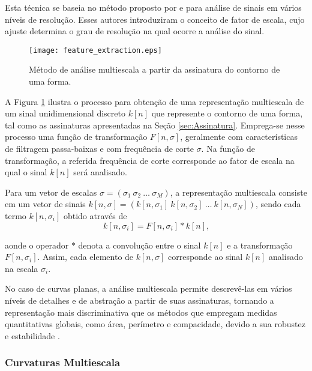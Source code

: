 Esta técnica se baseia no método proposto por  e  para análise de sinais em vários níveis de resolução. Esses autores introduziram o conceito de fator de escala, cujo ajuste determina o grau de resolução na qual ocorre a análise do sinal. 

\begin{figure}[h!]
  \caption{\label{fig:ms} Método de análise multiescala a partir da assinatura do contorno de uma forma.}
  \centering
  \texttt{[image: feature\_extraction.eps]}
\end{figure}

A Figura \ref{fig:ms} ilustra o processo para obtenção de uma representação multiescala de um sinal unidimensional discreto $k[n]$ que represente o contorno de uma forma, tal como as assinaturas apresentadas na Seção \ref{sec:Assinatura}. Emprega-se nesse processo uma função de transformação $F[n,\sigma]$, geralmente com características de filtragem passa-baixas e com frequência de corte $\sigma$. Na função de transformação, a referida frequência de corte corresponde ao fator de escala na qual o sinal $k[n]$ será analisado. 

Para um vetor de escalas $\sigma = (\sigma_1\:\sigma_2\:\ldots\:\sigma_M) $, a representação multiescala consiste em um vetor de sinais $k[n,\sigma] = (k[n,\sigma_1]\:k[n,\sigma_2]\:\ldots\:k[n,\sigma_N])$, sendo cada termo $k[n,\sigma_i]$ obtido através de
\begin{equation}\label{eq:ms1}
k[n,\sigma_i] = F[n,\sigma_i]*k[n]\text{,}
\end{equation}

\noindent
 aonde o operador $*$ denota a convolução entre o sinal $k[n]$ e a transformação $F[n,\sigma_i]$.  Assim, cada elemento de $k[n,\sigma]$ corresponde ao sinal $k[n]$ analisado na escala $\sigma_i$.

No caso de curvas planas, a análise multiescala permite descrevê-las em vários níveis de detalhes e de abstração a partir de suas assinaturas, tornando a representação mais discriminativa que os métodos que empregam medidas quantitativas globais, como área, perímetro e compacidade, devido a sua robustez e estabilidade \cite{4756134}.    

\subsubsection*{Curvaturas Multiescala\label{subsec:curvMS}}

